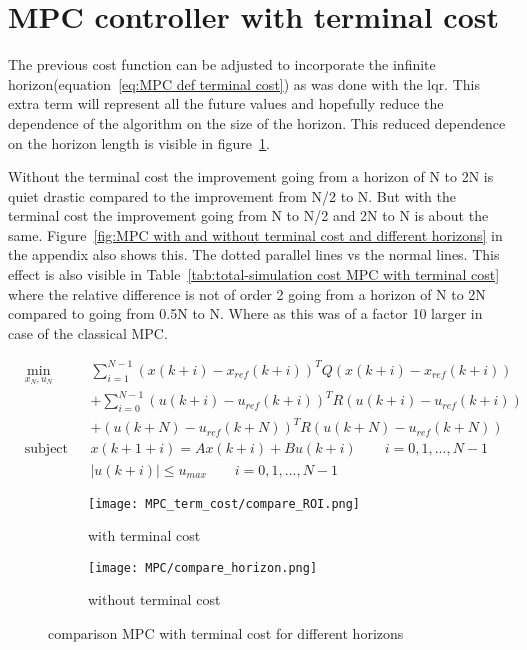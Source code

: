 \section{MPC controller with terminal cost}
The previous cost function can be adjusted to incorporate the infinite horizon(equation~\ref{eq:MPC def terminal cost}) as was done with the lqr. This extra term will represent all the future values and hopefully reduce the dependence of the algorithm on the size of the horizon. This reduced dependence on the horizon length is visible in figure~\ref{fig:comparison MPC with terminal cost for different horizons}. 

Without the terminal cost the improvement going from a horizon of N to 2N is quiet drastic compared to the improvement from N/2 to N. But with the terminal cost the improvement going from N to N/2 and 2N to N is about the same. Figure~\ref{fig:MPC with and without terminal cost and different horizons} in the appendix also shows this. The dotted parallel lines vs the normal lines. This effect is also visible in Table~\ref{tab:total-simulation cost MPC with terminal cost} where the relative difference is not of order 2 going from a horizon of N to 2N compared to going from 0.5N to N. Where as this was of a factor 10 larger in case of the classical MPC.

\begin{equation}
	\begin{aligned}
		& \min_{x_N,u_N}
		& & \sum^{N-1}_{i=1} 	(x(k+i) - x_{ref}(k+i))^TQ(x(k+i) - x_{ref}(k+i)) \\
		& & & + \sum^{N-1}_{i=0} 	(u(k+i) - u_{ref}(k+i))^TR(u(k+i) - u_{ref}(k+i))\\
		& & & + (u(k+N) - u_{ref}(k+N))^TR(u(k+N) - u_{ref}(k+N))\\
		& \text{subject to}
		& & x(k+1+i) = Ax(k+i) +Bu(k+i) \qquad    i=0,1,..., N-1\\
		&&& |u(k+i)| \leq u_{max} \qquad    i=0,1,..., N-1
	\end{aligned}
	\label{eq:MPC def terminal cost}
\end{equation}

\begin{figure}[H]
	\centering
	\begin{subfigure}[b]{0.45\textwidth}
		\texttt{[image: MPC\_term\_cost/compare\_ROI.png]}
		\caption{with terminal cost}
	\end{subfigure}
	\begin{subfigure}[b]{0.45\textwidth}
		\texttt{[image: MPC/compare\_horizon.png]}
		\caption{without terminal cost}
	\end{subfigure}
	\caption{comparison MPC with terminal cost for different horizons}
	\label{fig:comparison MPC with terminal cost for different horizons}
\end{figure} 

